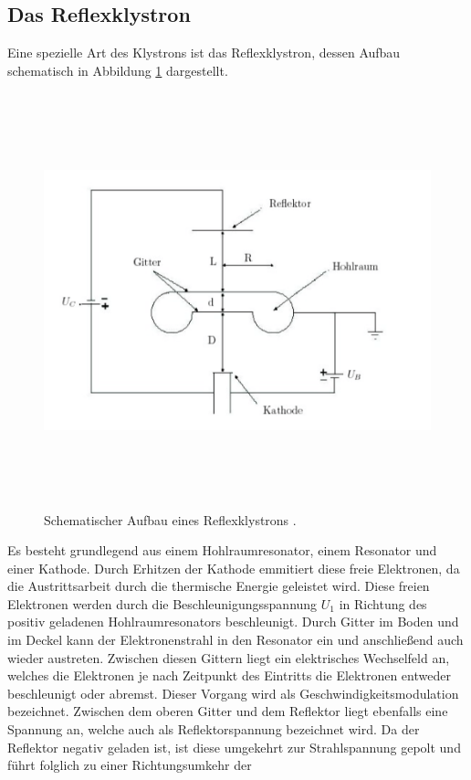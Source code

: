 \subsection{Das Reflexklystron}
Eine spezielle Art des Klystrons ist das Reflexklystron, dessen Aufbau schematisch in Abbildung \ref{fig:kly}
dargestellt.
\begin{figure}[H]
  \centering
  \includegraphics[height=12cm]{kly.png}
  \caption{Schematischer Aufbau eines Reflexklystrons \cite{Kly}.}
  \label{fig:kly}
\end{figure}
Es besteht grundlegend aus einem Hohlraumresonator, einem Resonator und einer Kathode.
Durch Erhitzen der Kathode emmitiert diese freie Elektronen, da die Austrittsarbeit durch die thermische
Energie geleistet wird. Diese freien Elektronen werden durch die Beschleunigungsspannung $U_1$ in Richtung
des positiv geladenen Hohlraumresonators beschleunigt. Durch Gitter im Boden und im Deckel kann der Elektronenstrahl
in den Resonator ein und anschließend auch wieder austreten. Zwischen diesen Gittern liegt ein elektrisches
Wechselfeld an, welches die Elektronen je nach Zeitpunkt des Eintritts die Elektronen entweder beschleunigt oder
abremst. Dieser Vorgang wird als Geschwindigkeitsmodulation bezeichnet. Zwischen dem oberen Gitter und dem
Reflektor liegt ebenfalls eine Spannung an, welche auch als Reflektorspannung bezeichnet wird. Da der Reflektor negativ
geladen ist, ist diese umgekehrt zur Strahlspannung gepolt und führt folglich zu einer Richtungsumkehr der
